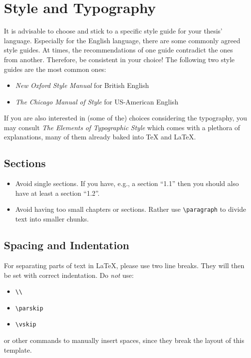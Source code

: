 \section{Style and Typography}

It is advisable to choose and stick to a specific style guide for your thesis' language.
Especially for the English language, there are some commonly agreed style guides.
At times, the recommendations of one guide contradict the ones from another.
Therefore, be consistent in your choice!
The following two style guides are the most common ones:
\begin{itemize}
\item \emph{New Oxford Style Manual} for British English
\item \emph{The Chicago Manual of Style} for US-American English
\end{itemize}

If you are also interested in (some of the) choices considering the typography, you may
consult \emph{The Elements of Typographic Style} which comes with a plethora of explanations,
many of them already baked into \TeX{} and \LaTeX{}.

\subsection{Sections}
\begin{itemize}
\item Avoid single sections. If you have, e.g., a section ``1.1'' then you should also
  have at least a section ``1.2''.
\item Avoid having too small chapters or sections. Rather use \verb+\paragraph+
  to divide text into smaller chunks.
\end{itemize}

\subsection{Spacing and Indentation}
For separating parts of text in \LaTeX, please use two line breaks. They will then
be set with correct indentation. Do \emph{not} use:
\begin{itemize}
  \itemsep0em
\item \texttt{\textbackslash\textbackslash}
\item \texttt{\textbackslash parskip}
\item \texttt{\textbackslash vskip}
\end{itemize}
or other commands to manually insert spaces, since they break the layout of this template.

